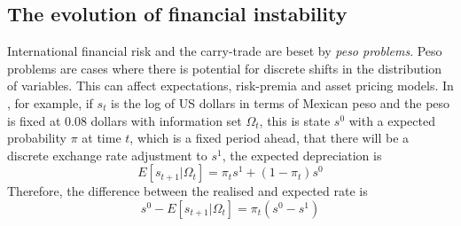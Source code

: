 \documentclass[12pt, a4paper, oneside]{article} %
\begin{document}


\subsection{The evolution of financial instability}
International financial risk and the carry-trade are beset by \emph{peso problems}. Peso problems are cases where there is  potential for discrete shifts in the distribution of variables.  This can affect expectations, risk-premia and asset pricing models. In \citet{evans199621}, for example, if $s_t$ is the log of US dollars in terms of Mexican peso and the peso is fixed at 0.08 dollars with information set $\Omega_t$, this is state $s^0$ with a expected probability $\pi$ at time $t$, which is a fixed period ahead, that there will be a discrete exchange rate adjustment to $s^1$, the expected depreciation is 
\begin{equation}
E[s_{t+1}|\Omega_t] = \pi_ts^1 + (1 - \pi_t)s^0
\end{equation}
Therefore, the difference between the realised and expected rate is 
\begin{equation}
s^0 - E[s_{t+1}|\Omega_t] = \pi_t(s^0 - s^1)
\end{equation}
\end{document}
